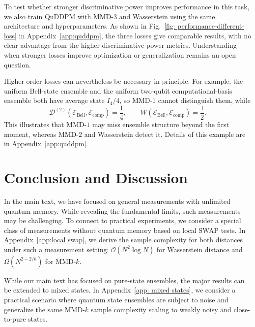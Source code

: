 \documentclass[aps,prx,reprint,superscriptaddress,amsmath,amssymb,longbibliography,floatfix]{revtex4-2}
\newcommand{\scD}{\mathcal{D}}
\newcommand{\scE}{\mathcal{E}}
\newcommand{\scO}{\mathcal{O}}
\theoremstyle{plain}
\theoremstyle{definition}
\theoremstyle{remark}
\begin{document}
To test whether stronger discriminative power improves performance in this task, we also train QuDDPM with MMD-\(3\) and Wasserstein using the same architecture and hyperparameters. As shown in Fig.~\ref{fig: performance-different-loss} in Appendix~\ref{app:quddpm}, the three losses give comparable results, with no clear advantage from the higher-discriminative-power metrics. Understanding when stronger losses improve optimization or generalization remains an open question.

Higher-order losses can nevertheless be necessary in principle. For example, the uniform Bell-state ensemble and the uniform two-qubit computational-basis ensemble both have average state \(I_4/4\), so MMD-\(1\) cannot distinguish them, while
\[
    \scD^{(2)}(\scE_{\mathrm{Bell}},\scE_{\mathrm{comp}})=\frac14,
    \qquad
    W(\scE_{\mathrm{Bell}},\scE_{\mathrm{comp}})=\frac12 .
\]
This illustrates that MMD-\(1\) may miss ensemble structure beyond the first moment, whereas MMD-\(2\) and Wasserstein detect it. Details of this example are in Appendix~\ref{app:quddpm}.





\section{Conclusion and Discussion}


In the main text, we have focused on general measurements with unlimited quantum memory. While revealing the fundamental limits, such measurements may be challenging. To connect to practical experiments, we consider a special class of measurements without quantum memory based on local SWAP tests. In Appendix~\ref{app:local swap}, we derive the sample complexity for both distances under such a measurement setting: $\scO({N^2}\log N)$ for Wasserstein distance and $\Omega(N^{2-2/k})$ for MMD-$k$. %





While our main text has focused on pure-state ensembles, the major results can be extended to mixed states. In Appendix~\ref{app: mixed states}, we consider a practical scenario where quantum state ensembles are subject to noise and generalize the same MMD-$k$ sample complexity scaling to weakly noisy and close-to-pure states. 
\end{document}
